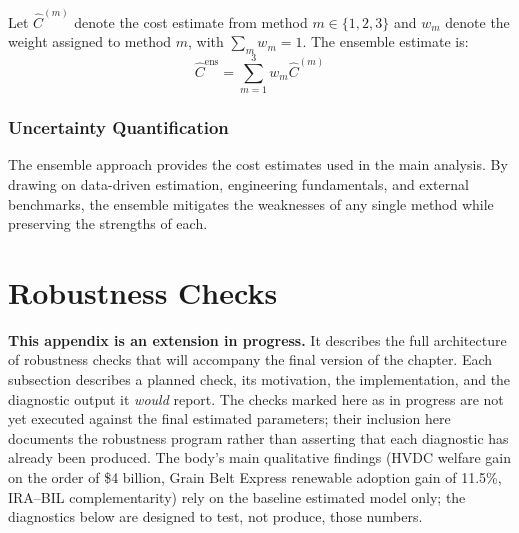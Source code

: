 \documentclass[12pt]{article}
\begin{document}

Let $\hat{C}^{(m)}$ denote the cost estimate from method $m \in \{1, 2, 3\}$ and $w_m$ denote the weight assigned to method $m$, with $\sum_m w_m = 1$. The ensemble estimate is:
\begin{equation}
\hat{C}^{\text{ens}} = \sum_{m=1}^{3} w_m \hat{C}^{(m)}
\label{eq:ensemble}
\end{equation}


\subsubsection{Uncertainty Quantification}



The ensemble approach provides the cost estimates used in the main analysis. By drawing on data-driven estimation, engineering fundamentals, and external benchmarks, the ensemble mitigates the weaknesses of any single method while preserving the strengths of each.


\section{Robustness Checks}\label{app:robustness}

\textbf{This appendix is an extension in progress.} It describes the full architecture of robustness checks that will accompany the final version of the chapter. Each subsection describes a planned check, its motivation, the implementation, and the diagnostic output it \textit{would} report. The checks marked here as in progress are not yet executed against the final estimated parameters; their inclusion here documents the robustness program rather than asserting that each diagnostic has already been produced. The body's main qualitative findings (HVDC welfare gain on the order of \$4 billion, Grain Belt Express renewable adoption gain of 11.5\%, IRA--BIL complementarity) rely on the baseline estimated model only; the diagnostics below are designed to test, not produce, those numbers.
\end{document}
